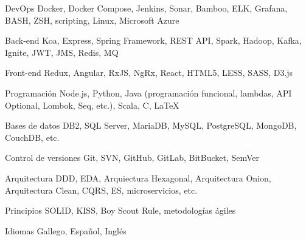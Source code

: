 
\begin{cvskills}
  \cvskill
    {DevOps}
    {Docker, Docker Compose, Jenkins, Sonar, Bamboo, ELK, Grafana, BASH, ZSH, scripting, Linux, Microsoft Azure}

  \cvskill
    {Back-end}
    {Koa, Express, Spring Framework, REST API, Spark, Hadoop, Kafka, Ignite, JWT, JMS, Redis, MQ}

  \cvskill
    {Front-end}
    {Redux, Angular, RxJS, NgRx, React, HTML5, LESS, SASS, D3.js}

  \cvskill
    {Programación}
    {Node.js, Python, Java (programación funcional, lambdas, API Optional, Lombok, Seq, etc.), Scala, C, LaTeX}

  \cvskill
    {Bases de datos}
    {DB2, SQL Server, MariaDB, MySQL, PostgreSQL, MongoDB, CouchDB, etc.}

  \cvskill
    {Control de versiones}
    {Git, SVN, GitHub, GitLab, BitBucket, SemVer}

  \cvskill
    {Arquitectura}
    {DDD, EDA, Arquiectura Hexagonal, Arquitectura Onion, Arquitectura Clean, CQRS, ES, microservicios, etc.}

  \cvskill
    {Principios}
    {SOLID, KISS, Boy Scout Rule, metodologías ágiles}

  \cvskill
    {Idiomas}
    {Gallego, Español, Inglés}
\end{cvskills}
